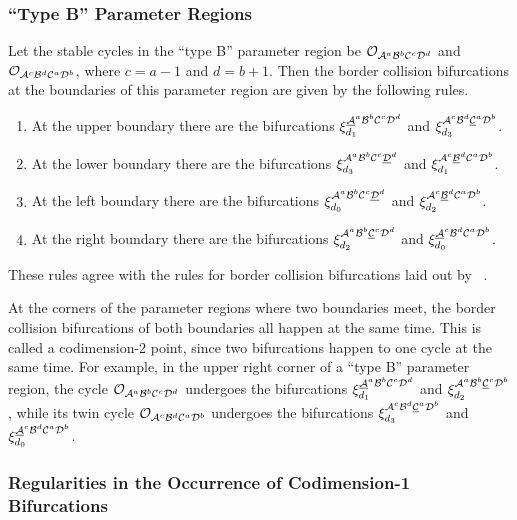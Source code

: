 \subsubsection{``Type B'' Parameter Regions}

Let the stable cycles in the ``type B'' parameter region be $\mathcal{O}_{\mathcal{A}^a\mathcal{B}^b\mathcal{C}^c\mathcal{D}^d}$ and $\mathcal{O}_{\mathcal{A}^c\mathcal{B}^d\mathcal{C}^a\mathcal{D}^b}$, where $c = a - 1$ and $d = b + 1$.
Then the border collision bifurcations at the boundaries of this parameter region are given by the following rules.

\begin{enumerate}
	\item At the upper boundary there are the bifurcations $\xi_{d_1}^{\underline{\mathcal{A}}^a\mathcal{B}^b\mathcal{C}^c\mathcal{D}^d}$ and $\xi_{d_3}^{\mathcal{A}^c\mathcal{B}^d\underline{\mathcal{C}}^a\mathcal{D}^b}$.
	\item At the lower boundary there are the bifurcations $\xi_{d_3}^{\mathcal{A}^a\mathcal{B}^b\mathcal{C}^c\underline{\mathcal{D}}^d}$ and $\xi_{d_1}^{\mathcal{A}^c\underline{\mathcal{B}}^d\mathcal{C}^a\mathcal{D}^b}$.
	\item At the left boundary there are the bifurcations $\xi_{d_0}^{\mathcal{A}^a\mathcal{B}^b\mathcal{C}^c\underline{\mathcal{D}}^d}$ and $\xi_{d_2}^{\mathcal{A}^c\underline{\mathcal{B}}^d\mathcal{C}^a\mathcal{D}^b}$.
	\item At the right boundary there are the bifurcations $\xi_{d_2}^{\mathcal{A}^a\mathcal{B}^b\underline{\mathcal{C}}^c\mathcal{D}^d}$ and $\xi_{d_0}^{\underline{\mathcal{A}}^c\mathcal{B}^d\mathcal{C}^a\mathcal{D}^b}$.
\end{enumerate}

These rules agree with the rules for border collision bifurcations laid out by ~\cite{akyuz2022}.

At the corners of the parameter regions where two boundaries meet, the border collision bifurcations of both boundaries all happen at the same time.
This is called a codimension-2 point, since two bifurcations happen to one cycle at the same time.
For example, in the upper right corner of a ``type B'' parameter region, the cycle $\mathcal{O}_{\mathcal{A}^a\mathcal{B}^b\mathcal{C}^c\mathcal{D}^d}$ undergoes the bifurcations $\xi_{d_1}^{\underline{\mathcal{A}}^a\mathcal{B}^b\mathcal{C}^c\mathcal{D}^d}$ and $\xi_{d_2}^{\mathcal{A}^a\mathcal{B}^b\underline{\mathcal{C}}^c\mathcal{D}^b}$, while its twin cycle $\mathcal{O}_{\mathcal{A}^c\mathcal{B}^d\mathcal{C}^a\mathcal{D}^b}$ undergoes the bifurcations $\xi_{d_3}^{\mathcal{A}^c\mathcal{B}^d\underline{\mathcal{C}}^a\mathcal{D}^b}$ and $\xi_{d_0}^{\underline{\mathcal{A}}^c\mathcal{B}^d\mathcal{C}^a\mathcal{D}^b}$.

\subsubsection{Regularities in the Occurrence of Codimension-1 Bifurcations}

